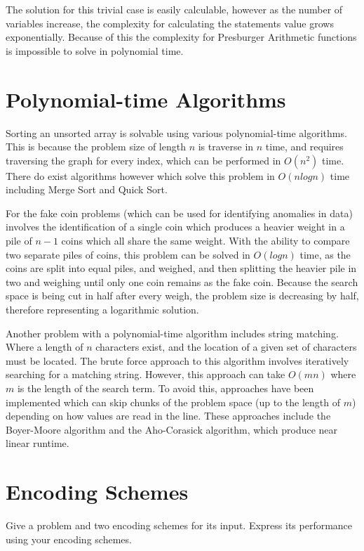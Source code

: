 \documentclass{article}
\renewcommand{\_}{\ifincsname_\else\legacyunderscore\fi}
\begin{document}
The solution for this trivial case is easily calculable, however as the number of variables increase, the complexity for calculating the statements value grows exponentially. Because of this the complexity for Presburger Arithmetic functions is impossible to solve in polynomial time.

\section{Polynomial-time Algorithms}

Sorting an unsorted array is solvable using various polynomial-time algorithms. This is because the problem size of length $n$ is traverse in $n$ time, and requires traversing the graph for every index, which can be performed in $O(n^2)$ time. There do exist algorithms however which solve this problem in $O(n log n)$ time including Merge Sort and Quick Sort.

For the fake coin problems (which can be used for identifying anomalies in data) involves the identification of a single coin which produces a heavier weight in a pile of $n-1$ coins which all share the same weight. With the ability to compare two separate piles of coins, this problem can be solved in $O(log n)$ time, as the coins are split into equal piles, and weighed, and then splitting the heavier pile in two and weighing until only one coin remains as the fake coin. Because the search space is being cut in half after every weigh, the problem size is decreasing by half, therefore representing a logarithmic solution.

Another problem with a polynomial-time algorithm includes string matching. Where a length of $n$ characters exist, and the location of a given set of characters must be located. The brute force approach to this algorithm involves iteratively searching for a matching string. However, this approach can take $O(mn)$ where $m$ is the length of the search term. To avoid this, approaches have been implemented which can skip chunks of the problem space (up to the length of $m$) depending on how values are read in the line. These approaches include the Boyer-Moore algorithm and the Aho-Corasick algorithm, which produce near linear runtime.

\section{Encoding Schemes}

    Give a problem and two encoding schemes for its input.  Express its performance using your encoding schemes.


   
\end{document}

